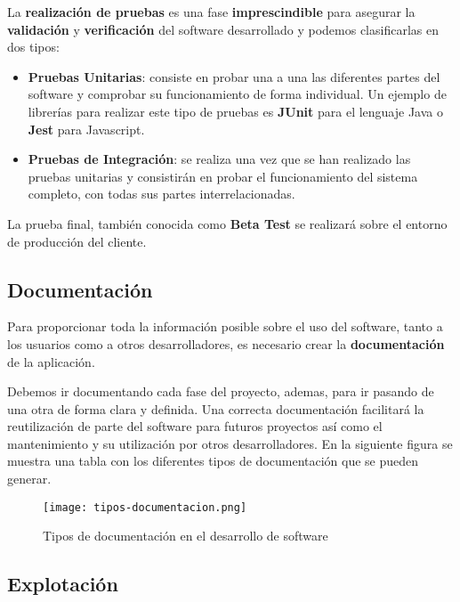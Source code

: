La \textbf{realización de pruebas} es una fase \textbf{imprescindible} para asegurar la \textbf{validación} y \textbf{verificación} del software desarrollado y podemos clasificarlas en dos tipos:

\begin{itemize}
    \item \textbf{Pruebas Unitarias}: consiste en probar una a una las diferentes partes del software y comprobar su funcionamiento de forma individual. Un ejemplo de librerías para realizar este tipo de pruebas es \textbf{JUnit} para el lenguaje Java o \textbf{Jest} para Javascript.
    \item \textbf{Pruebas de Integración}: se realiza una vez que se han realizado las pruebas unitarias y consistirán en probar el funcionamiento del sistema completo, con todas sus partes interrelacionadas.
\end{itemize}

La prueba final, también conocida como \textbf{Beta Test} se realizará sobre el entorno de producción del cliente.

\subsection{Documentación}
Para proporcionar toda la información posible sobre el uso del software, tanto a los usuarios como a otros desarrolladores, es necesario crear la \textbf{documentación} de la aplicación.

Debemos ir documentando cada fase del proyecto, ademas, para ir pasando de una otra de forma clara y definida. Una correcta documentación facilitará la reutilización de parte del software para futuros proyectos así como el mantenimiento y su utilización por otros desarrolladores. En la siguiente figura se muestra una tabla con los diferentes tipos de documentación que se pueden generar.

\begin{figure}[ht]
    \centering
    \texttt{[image: tipos-documentacion.png]}
    \caption{Tipos de documentación en el desarrollo de software}
\end{figure}

\subsection{Explotación}


\glsaddall
\printglossaries


\newpage
{}



